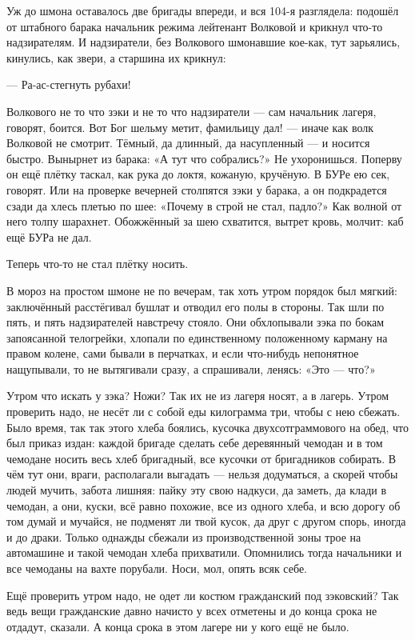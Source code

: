 Уж до шмона оставалось две бригады впереди, и вся 104-я разглядела: подошёл от штабного барака 
начальник режима лейтенант Волковой и крикнул что-то надзирателям. И надзиратели, без 
Волкового шмонавшие кое-как, тут зарьялись, кинулись, как звери, а старшина их крикнул:

--- Ра-ас-стегнуть рубахи!

Волкового не то что зэки и не то что надзиратели --- сам начальник лагеря, говорят, боится. Вот 
Бог шельму метит, фамильицу дал! --- иначе как волк Волковой не смотрит. Тёмный, да длинный, да 
насупленный --- и носится быстро. Вынырнет из барака: «А тут что собрались?» Не ухоронишься. 
Поперву он ещё плётку таскал, как рука до локтя, кожаную, кручёную. В БУРе ею сек, говорят. Или 
на проверке вечерней столпятся зэки у барака, а он подкрадется сзади да хлесь плетью по шее: 
«Почему в строй не стал, падло?» Как волной от него толпу шарахнет. Обожжённый за шею 
схватится, вытрет кровь, молчит: каб ещё БУРа не дал.

Теперь что-то не стал плётку носить.

В мороз на простом шмоне не по вечерам, так хоть утром порядок был мягкий: заключённый 
расстёгивал бушлат и отводил его полы в стороны. Так шли по пять, и пять надзирателей 
навстречу стояло. Они обхлопывали зэка по бокам запоясанной телогрейки, хлопали по 
единственному положенному карману на правом колене, сами бывали в перчатках, и если 
что-нибудь непонятное нащупывали, то не вытягивали сразу, а спрашивали, ленясь: «Это --- что?»

Утром что искать у зэка? Ножи? Так их не из лагеря носят, а в лагерь. Утром проверить надо, не 
несёт ли с собой еды килограмма три, чтобы с нею сбежать. Было время, так так этого хлеба 
боялись, кусочка двухсотграммового на обед, что был приказ издан: каждой бригаде сделать 
себе деревянный чемодан и в том чемодане носить весь хлеб бригадный, все кусочки от 
бригадников собирать. В чём тут они, враги, располагали выгадать --- нельзя додуматься, а 
скорей чтобы людей мучить, забота лишняя: пайку эту свою надкуси, да заметь, да клади в 
чемодан, а они, куски, всё равно похожие, все из одного хлеба, и всю дорогу об том думай и 
мучайся, не подменят ли твой кусок, да друг с другом спорь, иногда и до драки. Только однажды 
сбежали из производственной зоны трое на автомашине и такой чемодан хлеба прихватили. 
Опомнились тогда начальники и все чемоданы на вахте порубали. Носи, мол, опять всяк себе.

Ещё проверить утром надо, не одет ли костюм гражданский под зэковский? Так ведь вещи 
гражданские давно начисто у всех отметены и до конца срока не отдадут, сказали. А конца срока 
в этом лагере ни у кого ещё не было.

